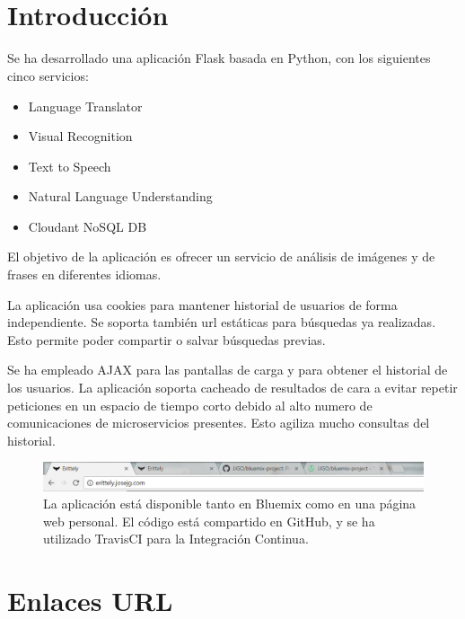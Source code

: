 \documentclass[a4paper]{article}
\title{\HWTitle \\ \vspace{.25cm}}
\date{\HWDueDate}
\author{\HWAuthorName}
\begin{document}
\maketitle
\pagestyle{fancy}
\vfill
\vfill\vfill
\newpage
\section{Introducción} %
\label{sec:introducción}
  Se ha desarrollado una aplicación Flask basada en Python, con los siguientes cinco servicios:
  \begin{itemize}
    \item Language Translator
    \item Visual Recognition
    \item Text to Speech
    \item Natural Language Understanding
    \item Cloudant NoSQL DB
  \end{itemize}
  El objetivo de la aplicación es ofrecer un servicio de análisis de imágenes y de frases en diferentes idiomas.

  La aplicación usa cookies para mantener historial de usuarios de forma independiente. Se soporta también url estáticas para búsquedas ya realizadas. Esto permite poder compartir o salvar búsquedas previas.

  Se ha empleado AJAX para las pantallas de carga y para obtener el historial de los usuarios. La aplicación soporta cacheado de resultados de cara a evitar repetir peticiones en un espacio de tiempo corto debido al alto numero de comunicaciones de microservicios presentes. Esto agiliza mucho consultas del historial.

\begin{figure}[htp!]
    \centering
    \caption{La aplicación está disponible tanto en Bluemix como en una página web personal. El código está compartido en GitHub, y se ha utilizado TravisCI para la Integración Continua.}
    \label{fig:webs}
    \includegraphics[width=\textwidth]{webs1}
\end{figure}
\section{Enlaces URL} %
\label{sec:enlaces_url}

\end{document}
